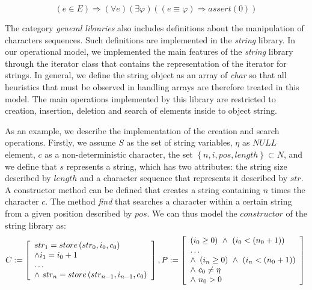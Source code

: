 \documentclass[a4paper]{llncs}
\begin{document}
{\begin{equation}
\label{stdexcept}
\left( e \in E \right)
\Rightarrow \left(\forall e\right)\left(\exists\varphi\right)\left(\left(e\equiv\varphi\right)
\Rightarrow assert\left(0\right)\right)
\end{equation}

The category \textit{general libraries} also includes definitions
about the manipulation of characters sequences. Such definitions
are implemented in the \textit{string} library. In our operational
model, we implemented the main features of the \textit{string}
library through the iterator class that contains the
representation of the iterator for strings. In general,
we define the string object as an array of \textit{char} so that all
heuristics that must be observed in handling arrays are therefore
treated in this model. The main operations implemented by this library
are restricted to creation, insertion, deletion and search of elements
inside to object string.

As an example, we describe the implementation of the creation and search
operations. Firstly, we assume $S$ as the set of string variables,
$\eta$ as $NULL$ element, $c$ as a non-deterministic character,
the set $\left\{n, i, pos, length\right\} \subset N$,
and we define that $s$ represents a string, which has two attributes:
the string size described by $length$ and a character sequence that
represents it described by $str$. A constructor method can be defined
that creates a string containing $n$ times the character $c$. The method
\textit{find} that searches a character within a certain string from a
given position described by $pos$. We can thus model the $constructor$
of the string library as:
%
\begin{equation}
\label{constructor-string}
C := \left [ \begin{array}{ll}
                str_{1} = store\left(str_{0}, i_{0}, c_{0}\right) \\
		\wedge i_{1} = i_{0} + 1  \\
		\ldots \\
		\wedge \, \, str_{n} = store\left(str_{n-1}, i_{n-1}, c_{0}\right)
              \end{array} \right ],  \\
P := \left [ \begin{array}{ll}
                \left(i_{0} \geq 0\right)  \, \, \wedge \, \, \left(i_{0} < \left(n_{0} + 1\right)\right)\\
                \ldots \\
                \wedge \, \, \left(i_{n} \geq 0\right)  \, \, \wedge \, \, \left(i_{n} < \left(n_{0} + 1\right)\right)\\
                \wedge \, \, c_{0} \neq \eta\\
                \wedge \, \, n_{0} > 0\\
              \end{array} \right ]  \\
\end{equation}

}
\end{document}
